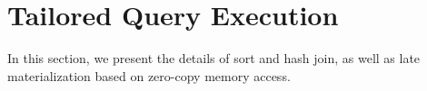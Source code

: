 \begin{comment}
We explain how the executor carries out the \texttt{ExKernel} through an example presented in Figure~\ref{fig:pipeline-details}.
The pipeline executor divides the GPU memory into three parts, which include a pair of memory buffers \texttt{mem A} and \texttt{mem B} as well as a piece of memory \texttt{tmp} to hold the temporaries for GPU kernels.
The MI100 we use has 32GiB (GiB = $1024^3$B) memory, and we allocate 16GB (GB = $1^9$B) each for \texttt{mem A} and \texttt{mem B}.
The remaining is allocated to \texttt{tmp}.
The executor performs the computation in a software-pipelined manner~\cite{softpipe-pldi-1988}, which finishes in multiple cycles.
During the $n$th pipeline cycle $C_n$, the executor operates \texttt{mem A} and \texttt{mem B} in parallel.
The executor invokes the \texttt{kernel(it=n-1)}, to process the $(n-1)$th chunk loaded to \texttt{mem B} in the previous pipeline cycle (\circled{1}).
The operator will read and write \texttt{mem B} as well as \texttt{tmp}, and leaves the output in \texttt{mem B} (\circled{2}).
The executor records the returned \texttt{type} code by \texttt{kernel()} to locate the input buffer and output buffer in the next pipeline cycle (\circled{3}).
Simultaneously, the executor performs an \texttt{Exchange} operation over \texttt{mem A}, setting the source and destination based on the \texttt{type} code recorded in the previous cycle (\circled{4}).
The input for the $n$th chunk is loaded from the CPU and the output of the $(n - 2)$th chunk is saved to the CPU (\circled{5}).


In the following sections, we explain how to implement sort, hash join, and queries in Star Schema Benchmark (SSB) with this programming model as case studies.
\end{comment}

\section{Tailored Query Execution}
\label{sec:query-execution}
In this section, we present the details of sort and hash join, as well as late materialization based on zero-copy memory access.


